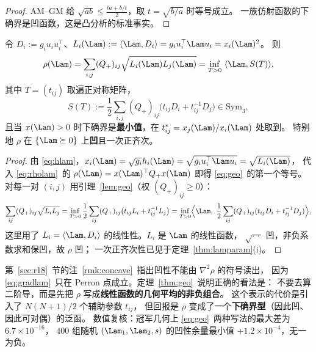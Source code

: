 \begin{proof}
AM--GM 给 $\sqrt{ab}\le\frac{ta+b/t}2$，取 $t=\sqrt{b/a}$ 时等号成立。
一族仿射函数的下确界是凹函数，这是凸分析的标准事实。
\end{proof}

\begin{theorem}\label{thm:geo}
令 $D_i:=g_iu_iu_i^\top$、$L_i(\Lam):=\langle\Lam,D_i\rangle=g_iu_i^\top\Lam u_i=x_i(\Lam)^2$。
则
\begin{equation}\label{eq:geo}
\rho(\Lam)=\sum_{i,j}(Q_+)_{ij}\sqrt{L_i(\Lam)L_j(\Lam)}
=\inf_{T>0}\ \langle\Lam,S(T)\rangle ,
\end{equation}
其中 $T=(t_{ij})$ 取遍正对称矩阵，
\begin{equation}\label{eq:ST}
S(T):=\frac12\sum_{i,j}(Q_+)_{ij}\bigl(t_{ij}D_i+t_{ij}^{-1}D_j\bigr)\in\mathrm{Sym}_3 ,
\end{equation}
且当 $x(\Lam)>0$ 时下确界是\textbf{最小值}，在 $t^*_{ij}=x_j(\Lam)/x_i(\Lam)$ 处取到。
特别地 $\rho$ 在 $\{\Lam\succeq0\}$ 上\textbf{凹}且一次正齐次。
\end{theorem}

\begin{proof}
由 \eqref{eq:hlam}，$x_i(\Lam)=\sqrt{g_i}h_i(\Lam)=\sqrt{g_iu_i^\top\Lam u_i}=\sqrt{L_i(\Lam)}$，
代入 \eqref{eq:rholam}~的 $\rho(\Lam)=x(\Lam)^\top Q_+x(\Lam)$ 即得 \eqref{eq:geo}~的第一个等号。
对每一对 $(i,j)$ 用引理~\ref{lem:geo}（权 $(Q_+)_{ij}\ge0$）：
\[
\sum_{ij}(Q_+)_{ij}\sqrt{L_iL_j}
=\inf_{T>0}\frac12\sum_{ij}(Q_+)_{ij}\bigl(t_{ij}L_i+t_{ij}^{-1}L_j\bigr)
=\inf_{T>0}\Bigl\langle\Lam,\ \frac12\sum_{ij}(Q_+)_{ij}(t_{ij}D_i+t_{ij}^{-1}D_j)\Bigr\rangle ,
\]
这里用了 $L_i=\langle\Lam,D_i\rangle$ 的线性性。$L_i$ 是 $\Lam$ 的线性函数，
$\sqrt{\cdot\,\cdot}$ 凹，非负系数求和保凹，故 $\rho$ 凹；
一次正齐次性已见于定理~\ref{thm:lamparam}(i)。
\end{proof}

\begin{remark}\label{rmk:concwhy}
第~\ref{sec:r18}~节的注~\ref{rmk:concave}~指出凹性不能由 $\nabla^2\rho$ 的符号读出，
因为 \eqref{eq:gradlam}~只在 Perron 点成立。定理~\ref{thm:geo}~说明正确的看法是：
不要去算二阶导，而是先把 $\rho$ 写成\textbf{线性函数的几何平均的非负组合}。
这个表示的代价是引入了 $N(N+1)/2$ 个辅助参数 $t_{ij}$，
但回报是 $\rho$ 变成了一个\textbf{下确界型}（因此凹、因此可对偶）的泛函。
数值复核：冠军几何上 \eqref{eq:geo}~两种写法的最大差为 $6.7\times10^{-16}$，
$400$ 组随机 $(\Lam_1,\Lam_2,s)$ 的凹性余量最小值 $+1.2\times10^{-4}$，无一为负。
\end{remark}

